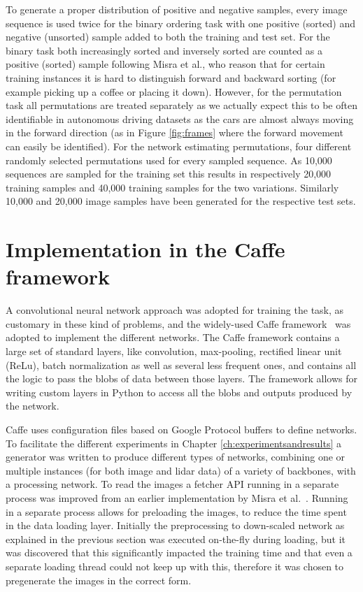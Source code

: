 To generate a proper distribution of positive and negative samples, every image sequence is used twice for the binary ordering task with one positive (sorted) and negative (unsorted) sample added to both the training and test set. For the binary task both increasingly sorted and inversely sorted are counted as a positive (sorted) sample following Misra et al.\cite{misra2016}, who reason that for certain training instances it is hard to distinguish forward and backward sorting (for example picking up a coffee or placing it down). However, for the permutation task all permutations are treated separately as we actually expect this to be often identifiable in autonomous driving datasets as the cars are almost always moving in the forward direction (as in Figure \ref{fig:frames} where the forward movement can easily be identified). For the network estimating permutations, four different randomly selected permutations used for every sampled sequence. As 10,000 sequences are sampled for the training set this results in respectively 20,000 training samples and 40,000 training samples for the two variations. Similarly 10,000 and 20,000 image samples have been generated for the respective test sets. 

\section{Implementation in the Caffe framework}
A convolutional neural network approach was adopted for training the task, as customary in these kind of problems, and the widely-used Caffe framework~\cite{jia2014} was adopted to implement the different networks. The Caffe framework contains a large set of standard layers, like convolution, max-pooling, rectified linear unit (ReLu), batch normalization as well as several less frequent ones, and contains all the logic to pass the blobs of data between those layers. The framework allows for writing custom layers in Python to access all the blobs and outputs produced by the network.

Caffe uses configuration files based on Google Protocol buffers to define networks. To facilitate the different experiments in Chapter \ref{ch:experimentsandresults} a generator was written to produce different types of networks, combining one or multiple instances (for both image and lidar data) of a variety of backbones, with a processing network. To read the images a fetcher API running in a separate process was improved from an earlier implementation by Misra et al.~\cite{misra2016}. Running in a separate process allows for preloading the images, to reduce the time spent in the data loading layer. Initially the preprocessing to down-scaled network as explained in the previous section was executed on-the-fly during loading, but it was discovered that this significantly impacted the training time and that even a separate loading thread could not keep up with this, therefore it was chosen to pregenerate the images in the correct form.

